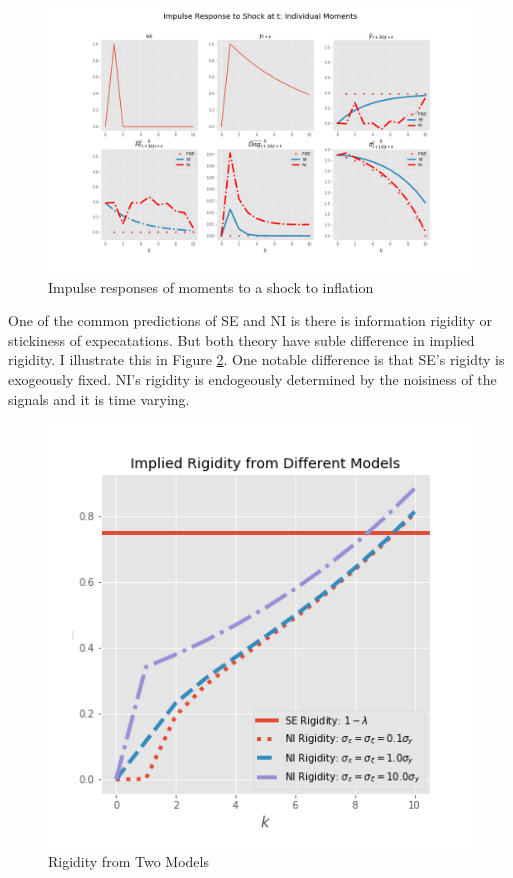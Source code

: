 \documentclass[]{article}
\begin{document}
\begin{figure}[h]\label{ir_pop}
	\centering
	\includegraphics[width=15cm]{figures/ir_popseni.png} 
	\caption{Impulse responses of moments to a shock to inflation}
\end{figure}

One of the common predictions of SE and NI is there is information rigidity or stickiness of expecatations.  But both theory have suble difference in implied rigidity. I illustrate this in Figure \ref{rigidity}. One notable difference is that SE's rigidty is exogeously fixed. NI's rigidity is endogeously determined by the noisiness of the signals and it is time varying. 
 
\begin{figure}[h]\label{rigidity}
	\centering
	\includegraphics[width=13cm]{figures/rigidity.png} 
	\caption{Rigidity from Two Models}
\end{figure}
\end{document}
